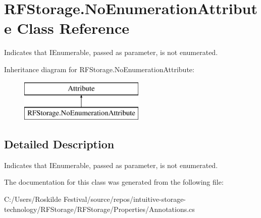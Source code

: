 \hypertarget{class_r_f_storage_1_1_no_enumeration_attribute}{}\section{R\+F\+Storage.\+No\+Enumeration\+Attribute Class Reference}
\label{class_r_f_storage_1_1_no_enumeration_attribute}


Indicates that I\+Enumerable, passed as parameter, is not enumerated.  


Inheritance diagram for R\+F\+Storage.\+No\+Enumeration\+Attribute\+:\begin{figure}[H]
\begin{center}
\leavevmode
\includegraphics[height=2.000000cm]{class_r_f_storage_1_1_no_enumeration_attribute}
\end{center}
\end{figure}


\subsection{Detailed Description}
Indicates that I\+Enumerable, passed as parameter, is not enumerated. 



The documentation for this class was generated from the following file\+:\begin{DoxyCompactItemize}
\item 
C\+:/\+Users/\+Roskilde Festival/source/repos/intuitive-\/storage-\/technology/\+R\+F\+Storage/\+R\+F\+Storage/\+Properties/Annotations.\+cs\end{DoxyCompactItemize}
